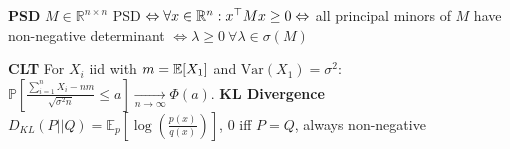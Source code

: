 \textbf{PSD}
$M \in \mathbb{R}^{n\times n}$ PSD $\Leftrightarrow \forall x \in \mathbb{R}^n: x^\top Mx \geq 0 \\
\Leftrightarrow$ all principal minors of $M$ have non-negative determinant $\Leftrightarrow \lambda \geq 0 \ \forall \lambda\in\sigma(M)$

\textbf{CLT} For $X_i$ iid with $m = \mathbb{E}[X_1]$ and $\text{Var}(X_1) = \sigma^2$: $\mathbb{P}\left[\frac{\sum_{i=1}^n X_i - n m}{\sqrt{\sigma^2 n}} \leq a\right] \xrightarrow[n \to \infty]{} \Phi(a)$.
\textbf{KL Divergence} $D_{KL}(P||Q) = \mathbb{E}_p[\log(\frac{p(x)}{q(x)})]$, 0 iff $P = Q$, always non-negative
